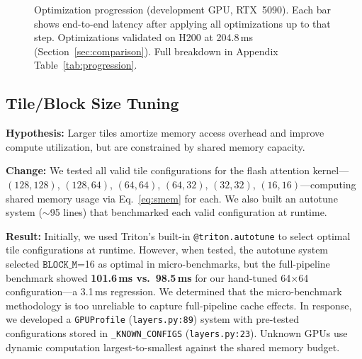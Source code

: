 \documentclass{article}
\begin{document}
\begin{figure}[h]
\centering
{}
\vspace{-1ex}
\caption{Optimization progression (development GPU, RTX~5090).  Each bar shows end-to-end latency after applying all optimizations up to that step.  Optimizations validated on H200 at 204.8\,ms (Section~\ref{sec:comparison}).  Full breakdown in Appendix Table~\ref{tab:progression}.}
\label{fig:progression}
\end{figure}

\subsection{Tile/Block Size Tuning}

\textbf{Hypothesis:} Larger tiles amortize memory access overhead and improve compute utilization, but are constrained by shared memory capacity.

\textbf{Change:} We tested all valid tile configurations for the flash attention kernel---$(128,128)$, $(128,64)$, $(64,64)$, $(64,32)$, $(32,32)$, $(16,16)$---computing shared memory usage via Eq.~\ref{eq:smem} for each.  We also built an autotune system ($\sim$95 lines) that benchmarked each valid configuration at runtime.

\textbf{Result:} Initially, we used Triton's built-in \texttt{@triton.autotune} to select optimal tile configurations at runtime.  However, when tested, the autotune system selected $\texttt{BLOCK\_M}$=16 as optimal in micro-benchmarks, but the full-pipeline benchmark showed \textbf{101.6\,ms vs.\ 98.5\,ms} for our hand-tuned 64$\times$64 configuration---a 3.1\,ms regression.  We determined that the micro-benchmark methodology is too unreliable to capture full-pipeline cache effects.
In response, we developed a \texttt{GPUProfile} (\texttt{layers.py:89}) system with pre-tested configurations stored in \texttt{\_KNOWN\_CONFIGS} (\texttt{layers.py:23}). Unknown GPUs use dynamic computation largest-to-smallest against the shared memory budget.
\end{document}
